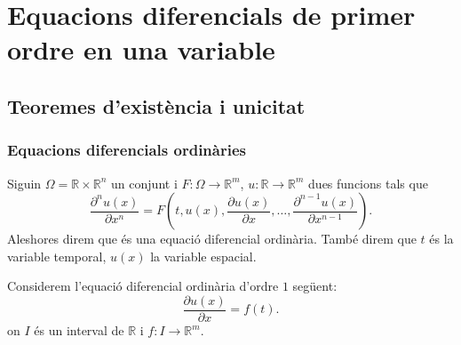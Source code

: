 \documentclass[../Apunts.tex]{subfiles}
\begin{document}
\chapter{Equacions diferencials de primer ordre en una variable}
	\section{Teoremes d'existència i unicitat}
	\subsection{Equacions diferencials ordinàries}
	\begin{definition}
		\label{def:equació diferencial ordinària d'ordre n}
		\label{def:solució de l'equació diferencial ordinària}
		Siguin \(\Omega=\mathbb{R}\times\mathbb{R}^{n}\) un conjunt i \(F\colon\Omega\longrightarrow\mathbb{R}^{m}\), \(u\colon\mathbb{R}\longrightarrow\mathbb{R}^{m}\) dues funcions tals que
		\[\frac{\partial^{n}u(x)}{\partial x^{n}}=F\left(t,u(x),\frac{\partial u(x)}{\partial x},\dots,\frac{\partial^{n-1}u(x)}{\partial x^{n-1}}\right).\]
		Aleshores direm que
		és una equació diferencial ordinària. També direm que \(t\) és la variable temporal, \(u(x)\) la variable espacial.
	\end{definition}
	\begin{example}
		Considerem l'equació diferencial ordinària d'ordre \(1\) següent:
		\[\frac{\partial u(x)}{\partial x}=f(t).\]
		on \(I\) és un interval de \(\mathbb{R}\) i \(f\colon I\longrightarrow\mathbb{R}^{m}\).
	\end{example}
\end{document}
